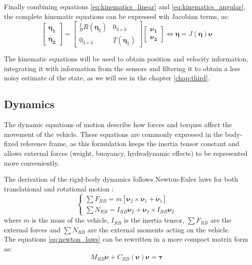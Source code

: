 Finally combining equations \ref{eq:kinematics_linear} and \ref{eq:kinematics_angular}, the complete kinematic equations can be expressed wih Jacobian terms, as:
\begin{equation}
    \begin{bmatrix}
        \dot{\mathbf{\eta_1}} \\
        \dot{\mathbf{\eta_2}}
    \end{bmatrix} = \begin{bmatrix}
        {}^{I}_{B}R(\mathbf{\eta}_2) & 0_{3 \times 3} \\
        0_{3 \times 3} & T(\mathbf{\eta}_2)
    \end{bmatrix} \begin{bmatrix}
        \mathbf{\nu_1} \\
        \mathbf{\nu_2}
    \end{bmatrix} \iff \dot{\mathbf{\eta}} = J(\mathbf{\eta})\mathbf{\nu}
    \label{eq:kinematics_complete}
\end{equation}

The kinematic equations will be used to obtain position and velocity information, integrating it with information from the sensors 
and filtering it to obtain a less noisy estimate of the state, as we will see in the chapter \ref{chap:third}. %

\subsection{Dynamics}
The dynamic equations of motion describe how forces and torques affect the movement of the vehicle. These equations are commonly expressed in the body-fixed 
reference frame, as this formulation keeps the inertia tensor constant and allows external forces (weight, buoyancy, hydrodynamic effects) to be represented more conveniently.

The derivation of the rigid-body dynamics follows Newton-Euler laws for both translational and rotational motion \cite{fossenHandbookMarineCraft2011}:
\begin{equation}
    \begin{cases}
        \sum F_{RB} = m[\mathbf{\nu}_2 \times \mathbf{\nu}_1 + \dot{\mathbf{\nu}}_1] \\
        \sum N_{RB} = I_{RB}\dot{\mathbf{\nu}}_2 + \mathbf{\nu}_2 \times I_{RB}\mathbf{\nu}_2
    \end{cases}
    \label{eq:newton_laws}
\end{equation}
where $m$ is the mass of the vehicle, $I_{RB}$ is the inertia tensor, $\sum F_{RB}$ are the external forces and $\sum N_{RB}$ are the external moments acting on the vehicle.\\
The equations \ref{eq:newton_laws} can be rewritten in a more compact matrix form as:
\begin{equation}
    M_{RB}\dot{\mathbf{\nu}} + C_{RB}(\mathbf{\nu})\mathbf{\nu} = \mathbf{\tau}
    \label{eq:6dof_dyn_simple}
\end{equation}


